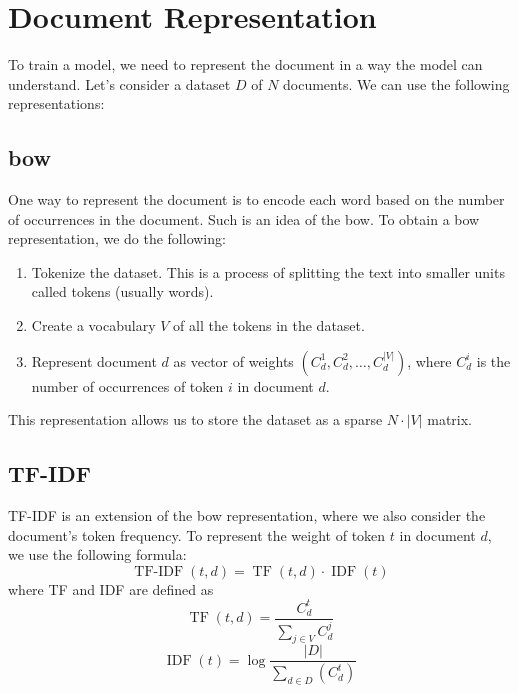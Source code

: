\section{Document Representation}
\label{sec:representation}
To train a model, we need to represent the document in a way the model can understand.
Let's consider a dataset $D$ of $N$ documents. We can use the following representations:

\subsection{\acl{bow}}
\label{sec:bow}
One way to represent the document is to encode each word based on the number of occurrences in the document.
Such is an idea of the \acf{bow}. To obtain a \ac{bow} representation, we do the following:
\begin{enumerate}
    \item Tokenize the dataset. This is a process of splitting the text into smaller units called tokens (usually words).
    \item Create a vocabulary $V$ of all the tokens in the dataset.
    \item Represent document $d$ as vector of weights $(C_{d}^1, C_{d}^2, \dots, C_{d}^{|V|})$, where $C_{d}^i$
          is the number of occurrences of token $i$ in document $d$.
\end{enumerate}
This representation allows us to store the dataset as a sparse $N \cdot |V|$ matrix.

\subsection{TF-IDF}
\label{sec:tfidf}
TF-IDF is an extension of the \ac{bow} representation, where we also consider the document's token frequency.
To represent the weight of token $t$ in document $d$, we use the following formula:
\begin{equation*}
    \label{eq:tfidf}
    \operatorname{TF-IDF}(t, d) = \operatorname{TF}(t, d) \cdot \operatorname{IDF}(t)
\end{equation*}
where TF and IDF are defined as
\begin{equation*}
    \label{eq:tf}
    \operatorname{TF}(t, d) = \frac{C_{d}^t}{\sum_{j \in V} C_{d}^{j}}
\end{equation*}
\begin{equation*}
    \label{eq:idf}
    \operatorname{IDF}(t) = \log \frac{|D|}{\sum_{d \in D} (C_{d}^t)}
\end{equation*}


